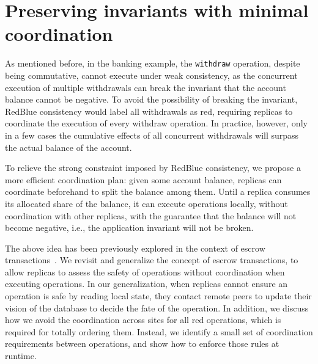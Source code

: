 \section{Preserving invariants with minimal coordination}
\label{sec:indigo}
As mentioned before, in the banking example, the {\tt withdraw} operation, despite
being commutative, cannot execute under weak consistency, as the concurrent
execution of multiple withdrawals can break the invariant that
the account balance cannot be negative. To avoid the possibility of breaking the invariant, RedBlue consistency would
label all withdrawals as red, requiring replicas to coordinate
the execution of every withdraw operation. In practice, however, only in a few cases the cumulative effects of all concurrent withdrawals
will surpass the actual balance of the account.

To relieve the strong constraint imposed by RedBlue consistency, we propose a more efficient
coordination plan: given some
account balance, replicas can coordinate beforehand to split the balance
among them. Until a replica consumes its allocated
share of the balance, it can execute operations locally, without
coordination with other replicas, with the guarantee that
the balance will not become negative, i.e., the application invariant will
not be broken.

The above idea has been previously explored in the
context of escrow transactions~\cite{BarbaraMilla1994Demarcation,ONeil1986Escrow}.
We revisit and generalize the concept of escrow transactions, to allow replicas to
assess the safety of operations without coordination when executing operations.
In our generalization, when replicas cannot ensure an operation is safe by
reading local state, they contact remote peers to update their vision of the
database to decide the fate of the operation.
In addition, we discuss how we avoid the coordination across sites for
all red operations, which is required for totally ordering them. Instead,
we identify a small set of coordination requirements between operations, and show
how to enforce those rules at runtime.

